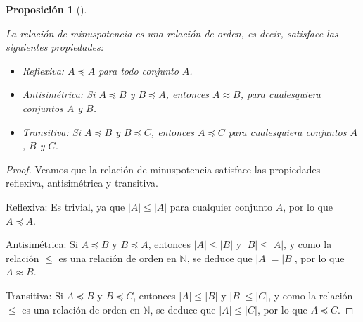 \documentclass[
  a4paper,
]{scrreport}
\providecommand{\tightlist}{%
  \setlength{\itemsep}{0pt}\setlength{\parskip}{0pt}}\usepackage{longtable,booktabs,array}
\theoremstyle{definition}
\theoremstyle{plain}
\theoremstyle{definition}
\theoremstyle{definition}
\theoremstyle{plain}
\theoremstyle{plain}
\newtheorem{proposition}{Proposición}[chapter]
\theoremstyle{remark}
\begin{document}
\begin{proposition}[]\protect\hypertarget{prp-minuspotencia-relacion-orden}{}\label{prp-minuspotencia-relacion-orden}

La relación de minuspotencia es una relación de orden, es decir,
satisface las siguientes propiedades:

\begin{itemize}
\tightlist
\item
  Reflexiva: \(A\preceq A\) para todo conjunto \(A\).
\item
  Antisimétrica: Si \(A\preceq B\) y \(B\preceq A\), entonces
  \(A\approx B\), para cualesquiera conjuntos \(A\) y \(B\).
\item
  Transitiva: Si \(A\preceq B\) y \(B\preceq C\), entonces
  \(A\preceq C\) para cualesquiera conjuntos \(A\), \(B\) y \(C\).
\end{itemize}

\end{proposition}

\begin{tcolorbox}[enhanced jigsaw, leftrule=.75mm, colbacktitle=quarto-callout-note-color!10!white, toprule=.15mm, opacityback=0, opacitybacktitle=0.6, toptitle=1mm, breakable, bottomtitle=1mm, colframe=quarto-callout-note-color-frame, rightrule=.15mm, titlerule=0mm, title=\textcolor{quarto-callout-note-color}{\faInfo}\hspace{0.5em}{Demostración}, arc=.35mm, left=2mm, bottomrule=.15mm, colback=white, coltitle=black]

\begin{proof}
Veamos que la relación de minuspotencia satisface las propiedades
reflexiva, antisimétrica y transitiva.

Reflexiva: Es trivial, ya que \(|A|\leq |A|\) para cualquier conjunto
\(A\), por lo que \(A\preceq A\).

Antisimétrica: Si \(A\preceq B\) y \(B\preceq A\), entonces
\(|A|\leq |B|\) y \(|B|\leq |A|\), y como la relación \(\leq\) es una
relación de orden en \(\mathbb{N}\), se deduce que \(|A|=|B|\), por lo
que \(A\approx B\).

Transitiva: Si \(A\preceq B\) y \(B\preceq C\), entonces \(|A|\leq |B|\)
y \(|B|\leq |C|\), y como la relación \(\leq\) es una relación de orden
en \(\mathbb{N}\), se deduce que \(|A|\leq |C|\), por lo que
\(A\preceq C\).
\end{proof}

\end{tcolorbox}
\end{document}
